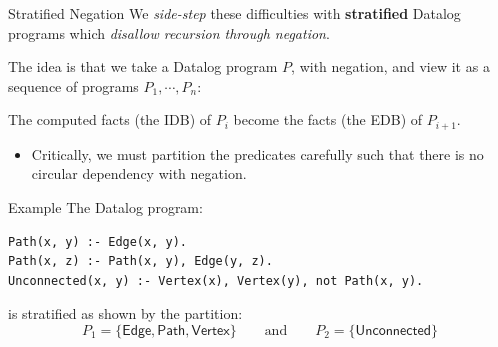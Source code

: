 \begin{frame}{Stratified Negation}
We \emph{side-step} these difficulties with \textbf{stratified} Datalog programs
which \emph{disallow recursion through negation}.

The idea is that we take a Datalog program $P$, with negation, and view it as a
sequence of programs $P_1, \cdots, P_n$: 

\medskip

\begin{center}
\end{center}

The computed facts (the IDB) of $P_i$ become the facts (the EDB) of $P_{i + 1}$.
\begin{itemize}
    \item Critically, we must partition the predicates carefully such that
    there is no circular dependency with negation.
\end{itemize}
\end{frame}

\begin{frame}[fragile]{Example}
The Datalog program: 

\begin{lstlisting}[language=flix, xleftmargin=0.8cm]
Path(x, y) :- Edge(x, y).
Path(x, z) :- Path(x, y), Edge(y, z).
Unconnected(x, y) :- Vertex(x), Vertex(y), not Path(x, y).
\end{lstlisting}

\pause

is stratified as shown by the partition:
%
$$
P_1 = \{ \textsf{Edge}, \textsf{Path}, \textsf{Vertex} \}
\qquad \text{and} \qquad
P_2 = \{ \textsf{Unconnected} \}
$$
\end{frame}

